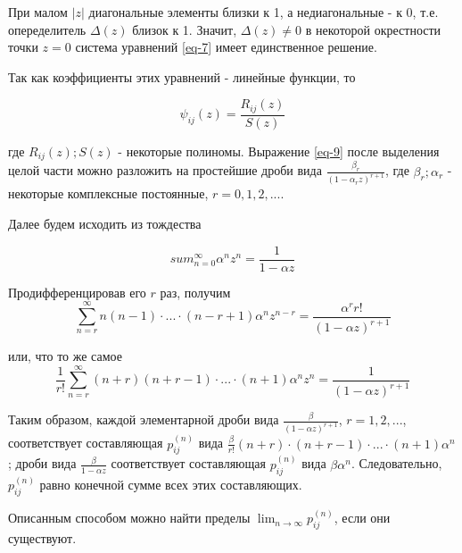 При малом $|z|$ диагональные элементы близки к 1, а недиагональные - к 0, т.е. опеределитель $\Delta(z)$ близок к 1. Значит, $\Delta(z) \neq 0$ в некоторой окрестности точки $z = 0$  система уравнений \eqref{eq-7} имеет единственное решение.
\par\medskip

Так как коэффициенты этих уравнений - линейные функции, то 

\begin{equation}\label{eq-9}
	\psi_{ij}(z) = \frac{R_{ij}(z)}{S(z)}
\end{equation}

где $R_{ij}(z); S(z)$ - некоторые полиномы. Выражение \eqref{eq-9} после выделения целой части можно разложить на простейшие дроби вида $\frac{\beta_r}{(1 - \alpha_r z)^{r + 1}}$, где $\beta_r; \alpha_r$ - некоторые комплексные постоянные, $r = 0,1,2,...$.

\par\medskip

Далее будем исходить из тождества

\begin{equation}\label{eq-10}
	sum_{n = 0}^{\infty}\alpha^{n}z^{n} = \frac{1}{1 - \alpha z}
\end{equation}

Продифференцировав его $r$ раз, получим
$$\sum_{n = r}^{\infty} n(n - 1)\cdot...\cdot(n - r + 1)\alpha^{n} z^{n - r} = \frac{\alpha^{r}r!}{(1 - \alpha z)^{r + 1}} $$

или, что то же самое
$$\frac{1}{r!} \sum_{n = r}^{\infty} (n + r)(n + r - 1)\cdot...\cdot(n + 1)\alpha^{n} z^{n} = \frac{1}{(1 - \alpha z)^{r + 1}} $$

Таким образом, каждой элементарной дроби вида $\frac{\beta}{(1 - \alpha z)^{r + 1}}$, $r = 1,2,...$, соответствует составляющая $p_{ij}^{(n)}$ вида $\frac{\beta}{r!} (n + r)\cdot(n + r - 1) \cdot ... \cdot (n + 1)\alpha^{n}$; дроби вида $\frac{\beta}{1 - \alpha z}$ соответствует составляющая $p_{ij}^{(n)}$ вида $\beta \alpha^{n}$. Следовательно, $p_{ij}^{(n)}$ равно конечной сумме всех этих составляющих. 

\par\medskip
Описанным способом можно найти пределы $\lim_{n \rightarrow \infty} p_{ij}^{(n)}$, если они существуют.
